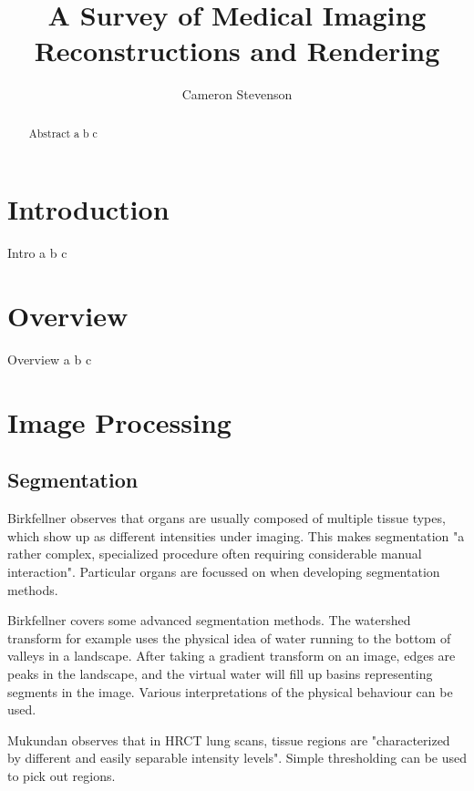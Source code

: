 \documentclass[acmsmall, 12pt]{acmart}
\begin{document}
\title{A Survey of Medical Imaging Reconstructions and Rendering}
\author{Cameron Stevenson}
 
\begin{abstract}
Abstract a b c
\end{abstract}

\maketitle

\section{Introduction}

Intro a b c

\section{Overview}

Overview a b c

\section{Image Processing}

\subsection{Segmentation}

Birkfellner \cite{birkfellner2016applied} observes that organs are usually composed of multiple tissue types, which show up as different intensities under imaging. This makes segmentation "a rather complex, specialized procedure often requiring considerable manual interaction". Particular organs are focussed on when developing segmentation methods.

Birkfellner \cite{birkfellner2016applied} covers some advanced segmentation methods. The watershed transform for example uses the physical idea of water running to the bottom of valleys in a landscape. After taking a gradient transform on an image, edges are peaks in the landscape, and the virtual water will fill up basins representing segments in the image. Various interpretations of the physical behaviour can be used.

Mukundan \cite{mukundan2016reconstruction} observes that in HRCT lung scans, tissue regions are "characterized by different and easily separable intensity levels". Simple thresholding can be used to pick out regions. 
\end{document}
